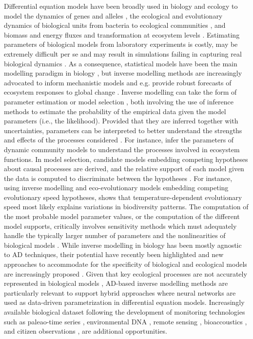 Differential equation models have been broadly used in biology and ecology to model the dynamics of genes and alleles \cite{Page2002}, the ecological and evolutionary dynamics of biological units from bacteria to ecological communities \cite{Gabor2015,Lion2018,Villa2021,Boussange2022,boussange2023a, Akesson2021,chalmandrier2021,VandenBerg2022}, and biomass and energy fluxes and transformation at ecosystem levels \cite{Weng2015,Schartau2017,Franklin2020,Geary2020}.
Estimating parameters of biological models from laboratory experiments is costly, may be extremely difficult per se \cite{Schartau2017} and may result in simulations failing in capturing real biological dynamics \cite{Watts2001}. 
As a consequence, statistical models have been the main modelling paradigm in biology \cite{zimmermann2010}, but inverse modelling methods are increasingly advocated to inform mechanistic models \cite{hartig2012,alsos2023,pantel2023} and e.g. provide robust forecasts of ecosystem responses to global change \cite{alsos2023}.
Inverse modelling can take the form of parameter estimation \cite{Schartau2017} or model selection \cite{Johnson2004}, both involving the use of inference methods to estimate the probability of the empirical data given the model parameters (i.e., the likelihood).
Provided that they are inferred together with uncertainties, parameters can be interpreted to better understand the strengths and effects of the processes considered \cite{Pontarp2019}. 
For instance, \cite{Higgins2010,Curtsdotter2019,godwin2020} infer the parameters of dynamic community models to understand the processes involved in ecosystem functions.
In model selection, candidate models embedding competing hypotheses about causal processes are derived, and the relative support of each model given the data is computed to discriminate between the hypotheses \cite{Johnson2004,alsos2023}.
For instance, using inverse modelling and eco-evolutionary models embedding competing evolutionary speed hypotheses, \cite{Skeels2022} shows that temperature-dependent evolutionary speed most likely explains variations in biodiversity patterns. 
The computation of the most probable model parameter values, or the computation of the different model supports, critically involves sensitivity methods which must adequately handle the typically larger number of parameters and the nonlinearities of biological models \cite{Gabor2015}.
While inverse modelling in biology has been mostly agnostic to AD techniques, their potential have recently been highlighted \cite{frank2022,alsos2023} and new approaches to accommodate for the specificity of biological and ecological models are increasingly proposed \cite{Yazdani2020,Boussange2022a,paredes2023}. Given that key ecological processes are not accurately represented in biological models \cite{hartig2012,Schartau2017,chalmandrier2021}, AD-based inverse modelling methods are particularly relevant to support hybrid approaches where neural networks are used as data-driven parametrization \cite{rasp2018,Boussange2022a} in differential equation models.
Increasingly available biological dataset following the development of monitoring technologies such as paleao-time series \cite{alsos2023}, environmental DNA \cite{Ruppert2019}, remote sensing \cite{Jetz2019}, bioaccoustics \cite{Aide2013}, and citizen observations \cite{GBIF}, are additional opportunities.
